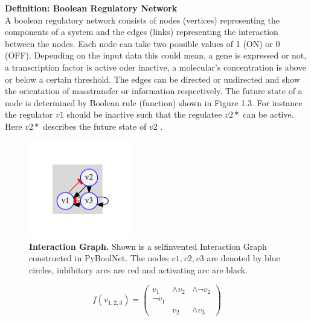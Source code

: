 \textbf{Definition: Boolean Regulatory Network}\\


\citep{10.1371/journal.pone.0066031}%
A boolean regulatory network consists of nodes (vertices) representing the components of a system and the edges (links) representing  the interaction between the nodes. Each node can take two possible values of 1 (ON) or 0 (OFF). Depending on the input data this could mean, a gene is expressed or not, a transcription factor is active oder inactive, a molecular's concentration is above or below a certain threshold. The edges can be directed or undirected and show the orientation of masstransfer or information respectively. The future state of a node is determined by Boolean rule (function) shown in Figure 1.3. For instance the regulator $v1$ should be inactive such that the regulatee $v2*$ can be active. Here $v2*$ describes the future state of $v2$ \citep{SAADATPOUR20133}. 

\begin{figure}[H]
\centering
\includegraphics[width=0.4\textwidth]{./Bilder/example02_igraph}
\caption[Interaction Graph]{\textbf{Interaction Graph.} Shown is a selfinvented Interaction Graph constructed in PyBoolNet. The nodes $v1,v2,v3$ are denoted by blue circles, inhibitory arcs are red and activating arc are black. }
\label{fig:Fig.3.}
\end{figure}

\begin{equation}
f(v_{1,2,3})= \begin{pmatrix}
 v_1      & \wedge v_2 & \wedge \neg v_2\\
 \neg v_1 &           & \\
         & v_2        &\wedge v_3
\end{pmatrix}
\end{equation} 



